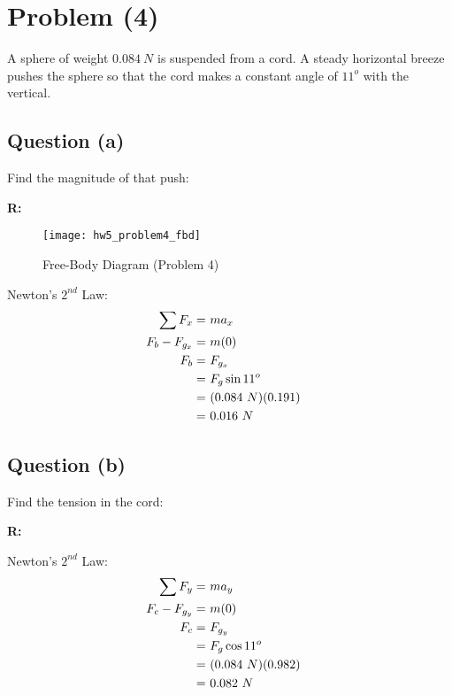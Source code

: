 \section{Problem (4)}

	A sphere of weight $0.084 \ N$ is suspended from a cord. A steady horizontal breeze pushes the sphere so that the cord makes a constant angle of $11^{o}$ with the vertical.

	\subsection{Question (a)}
		Find the magnitude of that push:

		\textbf{R:} \newline

		\begin{figure}[H]
			\begin{center}
				\texttt{[image: hw5\_problem4\_fbd]}
				\caption{Free-Body Diagram (Problem 4)}
				\label{fig:hw5_problem4_fbd}
			\end{center}
		\end{figure}

		Newton's $2^{nd}$ Law:
		\begin{align}
			\sum F_{x} = \ &ma_{x}& \notag \\
			F_{b} - F_{g_{x}} = \ &m(0)& \notag \\
			F_{b} = \ &F_{g_{x}}& \notag \\
			= \ &F_{g} \sin 11^{o}& \notag \\
			= \ &(0.084 \ N)(0.191)& \notag \\
			= \ &0.016 \ N&
		\end{align}

	\subsection{Question (b)}
		Find the tension in the cord:

		\textbf{R:} \newline

		Newton's $2^{nd}$ Law:
		\begin{align}
			\sum F_{y} = \ &ma_{y}& \notag \\
			F_{c} - F_{g_{y}} = \ &m(0)& \notag \\
			F_{c} = \ &F_{g_{y}}& \notag \\
			= \ &F_{g} \cos 11^{o}& \notag \\
			= \ &(0.084 \ N)(0.982)& \notag \\
			= \ &0.082 \ N&
		\end{align}
